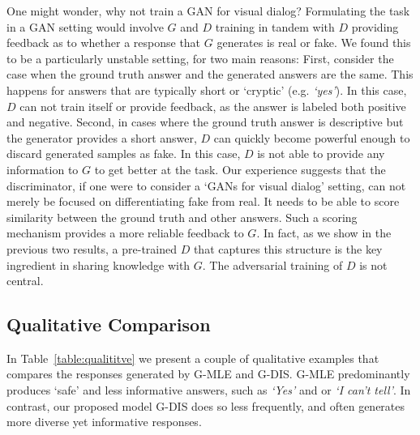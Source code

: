 \documentclass{article}
\newcommand{\myquote}[1]{\emph{`#1'}}
\begin{document}
One might wonder, why not train a GAN for visual dialog? Formulating the task in a GAN setting would involve $G$ and $D$  
training in tandem with $D$ providing feedback as to  whether a response that $G$ generates is real or fake.  We found this to be a particularly unstable setting, for two main reasons: 
First, consider the case when the ground truth answer and the generated answers are the same. This happens for answers that are typically  short or `cryptic' 
(e.g. \myquote{yes}). In this case, $D$ can not train itself or provide 
feedback, as the answer is labeled both positive and negative. Second, in cases where the  ground truth answer is descriptive but the generator provides a short answer, $D$ can  quickly become powerful enough to discard generated samples as fake. In this case, $D$ is  not able to provide any information to $G$ to get better at the task.  
Our experience suggests that the discriminator, if one were to consider a `GANs for visual dialog' setting, can not merely be focused on differentiating fake from real. It  needs to be able to score similarity between the ground truth and other answers. Such a scoring mechanism provides a more reliable feedback to $G$.  In fact, as we show in the previous two results, a pre-trained $D$ that captures this structure is the key ingredient in sharing knowledge with $G$. The adversarial training of $D$ is not central. 
\subsection{Qualitative Comparison}
\label{sec:quality-result}
In Table~\ref{table:qualititve} we present a couple of qualitative examples that compares the responses generated by G-MLE and G-DIS. G-MLE predominantly 
produces `safe' and less informative answers, such as \myquote{Yes} and or \myquote{I can't tell}. In contrast, our proposed model G-DIS does so less frequently, and often generates more diverse yet informative responses.
\end{document}
